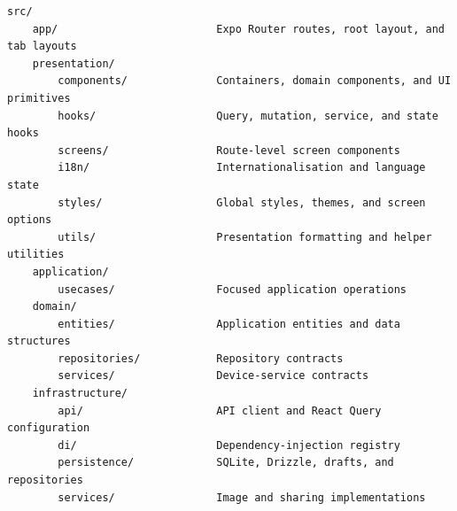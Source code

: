\begin{verbatim}
src/
    app/                         Expo Router routes, root layout, and tab layouts
    presentation/
        components/              Containers, domain components, and UI primitives
        hooks/                   Query, mutation, service, and state hooks
        screens/                 Route-level screen components
        i18n/                    Internationalisation and language state
        styles/                  Global styles, themes, and screen options
        utils/                   Presentation formatting and helper utilities
    application/
        usecases/                Focused application operations
    domain/
        entities/                Application entities and data structures
        repositories/            Repository contracts
        services/                Device-service contracts
    infrastructure/
        api/                     API client and React Query configuration
        di/                      Dependency-injection registry
        persistence/             SQLite, Drizzle, drafts, and repositories
        services/                Image and sharing implementations
\end{verbatim}
